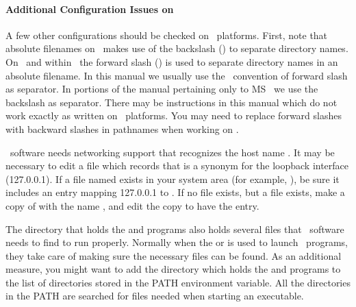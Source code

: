 \paragraph{Additional Configuration Issues on \Windows}

A few other configurations should be checked on \Windows\ platforms.
First, note that absolute filenames on \Windows\ makes use of the
backslash (\bs) to separate directory names.  On \Unix\ and
within \Tcl\ the forward slash (\fs) is used to separate directory
names in an absolute filename.  In this manual we usually use the
\Tcl\ convention of forward slash as separator.  In portions of the
manual pertaining only to MS \Windows\ we use the backslash as
separator.  There may be instructions in this manual which do not
work exactly as written on \Windows\ platforms.  You may need to
replace forward slashes with backward slashes in pathnames when
working on \Windows.

\OOMMF\ software needs networking support that recognizes
the host name .  It may be necessary
to edit a file which records that  is a synonym
for the loopback interface (127.0.0.1).  If a file named 
exists in your system area (for example, ),
be sure it includes an entry mapping 127.0.0.1 to .
If no  file exists, but a  file exists,
make a copy of  with the name , and edit
the copy to have the  entry.

The directory that holds the  and  programs also
holds several {} files that \OOMMF\ software needs to find to
run properly.  Normally when the  or
 is
used to launch \OOMMF\ programs, they take care of making sure the
necessary {} files can be found.  As an additional measure,
you might want to add the directory which holds the  and
 programs to the list of directories stored in the
PATH environment variable.  All the
directories in the PATH are searched for {} files needed when
starting an executable.  

